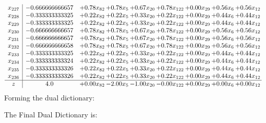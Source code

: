 \documentclass[8pt]{article}
\begin{document}
\[\begin{array}{c| c c@{\hskip 2pt} c@{\hskip 2pt} c@{\hskip 2pt} c@{\hskip 2pt} c@{\hskip 2pt} c@{\hskip 2pt} c@{\hskip 2pt} }
 x_{227}   &  -0.666666666657 & +  0.78 x_{82} & +  0.78 x_{5} & +  0.67 x_{20} & +  0.78 x_{122} & +  0.00 x_{29} & +  0.56 x_{6} & +  0.56 x_{12}\\
 x_{228}   &  -0.333333333325 & +  0.22 x_{82} & +  0.22 x_{5} & +  0.33 x_{20} & +  0.22 x_{122} & +  0.00 x_{29} & +  0.44 x_{6} & +  0.44 x_{12}\\
 x_{229}   &  -0.333333333325 & +  0.22 x_{82} & +  0.22 x_{5} & +  0.33 x_{20} & +  0.22 x_{122} & +  0.00 x_{29} & +  0.44 x_{6} & +  0.44 x_{12}\\
 x_{230}   &  -0.666666666657 & +  0.78 x_{82} & +  0.78 x_{5} & +  0.67 x_{20} & +  0.78 x_{122} & +  0.00 x_{29} & +  0.56 x_{6} & +  0.56 x_{12}\\
 x_{231}   &  -0.666666666657 & +  0.78 x_{82} & +  0.78 x_{5} & +  0.67 x_{20} & +  0.78 x_{122} & +  0.00 x_{29} & +  0.56 x_{6} & +  0.56 x_{12}\\
 x_{232}   &  -0.666666666658 & +  0.78 x_{82} & +  0.78 x_{5} & +  0.67 x_{20} & +  0.78 x_{122} & +  0.00 x_{29} & +  0.56 x_{6} & +  0.56 x_{12}\\
 x_{233}   &  -0.333333333325 & +  0.22 x_{82} & +  0.22 x_{5} & +  0.33 x_{20} & +  0.22 x_{122} & +  0.00 x_{29} & +  0.44 x_{6} & +  0.44 x_{12}\\
 x_{234}   &  -0.333333333324 & +  0.22 x_{82} & +  0.22 x_{5} & +  0.33 x_{20} & +  0.22 x_{122} & +  0.00 x_{29} & +  0.44 x_{6} & +  0.44 x_{12}\\
 x_{235}   &  -0.333333333326 & +  0.22 x_{82} & +  0.22 x_{5} & +  0.33 x_{20} & +  0.22 x_{122} & +  0.00 x_{29} & +  0.44 x_{6} & +  0.44 x_{12}\\
 x_{236}   &  -0.333333333326 & +  0.22 x_{82} & +  0.22 x_{5} & +  0.33 x_{20} & +  0.22 x_{122} & +  0.00 x_{29} & +  0.44 x_{6} & +  0.44 x_{12}\\
\hline
z    &  4.0 & +  0.00 x_{82} & -2.00 x_{5} & -1.00 x_{20} & -0.00 x_{122} & +  0.00 x_{29} & +  0.00 x_{6} & +  0.00 x_{12}\\
\end{array}\]
Forming the dual dictionary:

The Final Dual Dictionary is: 
\end{document}
